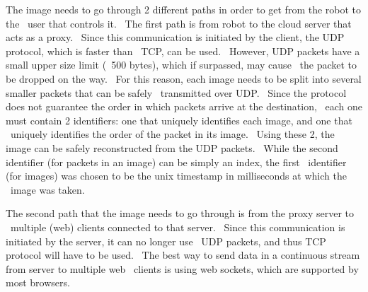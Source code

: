  The image needs to go through 2 different paths in order to get from the robot to the \
user that controls it. \
The first path is from robot to the cloud server that acts as a proxy. \
Since this communication is initiated by the client, the UDP protocol, which is faster than \
TCP, can be used. \
However, UDP packets have a small upper size limit (~500 bytes), which if surpassed, may cause \
the packet to be dropped on the way. \
For this reason, each image needs to be split into several smaller packets that can be safely \
transmitted over UDP. \
Since the protocol does not guarantee the order in which packets arrive at the destination, \
each one must contain 2 identifiers: one that uniquely identifies each image, and one that \
uniquely identifies the order of the packet in its image. \
Using these 2, the image can be safely reconstructed from the UDP packets. \
While the second identifier (for packets in an image) can be simply an index, the first \
identifier (for images) was chosen to be the unix timestamp in milliseconds at which the \
image was taken.

The second path that the image needs to go through is from the proxy server to \
multiple (web) clients connected to that server. \
Since this communication is initiated by the server, it can no longer use \
UDP packets, and thus TCP protocol will have to be used. \
The best way to send data in a continuous stream from server to multiple web \
clients is using web sockets, which are supported by most browsers.

